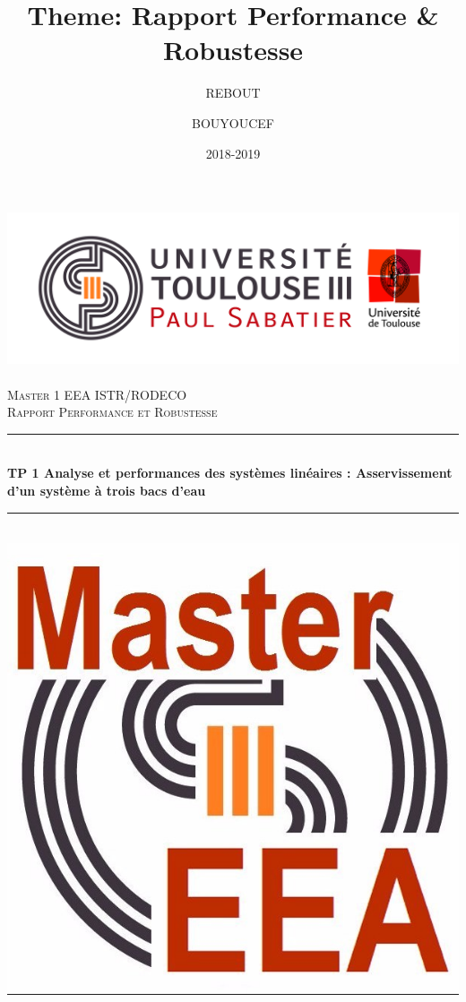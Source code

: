 \documentclass[12pt, a4paper, openany]{report}
\title{Theme: Rapport Performance & Robustesse}
\author{REBOUT \bsc{Mehenna}}
\author{BOUYOUCEF \bsc{Farid}}
\date{2018-2019}
\newcommand{\HRule}{\rule{\linewidth}{0.5mm}}
\begin{document}

\makeatletter
  \begin{titlepage}
  

  \begin{sffamily}
   \begin{center}

    \includegraphics[scale=0.5]{Logo_UT3.jpg}~\\[1.5cm]

    \textsc{\LARGE Master 1 EEA ISTR/RODECO  }\\[2cm]

    \textsc{\Large Rapport Performance et Robustesse}\\[1.5cm]

    \HRule \\[0.4cm] %
    { \huge \bfseries TP 1 Analyse et performances des systèmes linéaires : Asservissement d'un système à trois bacs d'eau\\[0.4cm] }

    \HRule \\[1cm]   %
    \includegraphics[scale=0.1]{logomaster.jpg}
    \\[1cm]


\end{center}
\end{sffamily}
\end{titlepage}
\end{document}
